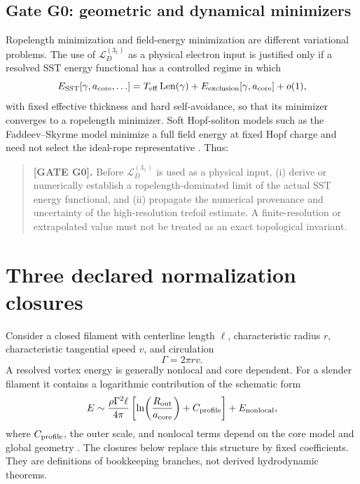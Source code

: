 \documentclass[aps,pre,preprint,notitlepage,nofootinbib,superscriptaddress]{revtex4-2}
\newcommand{\calL}{\mathcal L}
\begin{document}
\subsection{Gate G0: geometric and dynamical minimizers}
\label{subsec:G0}

Ropelength minimization and field-energy minimization are different variational problems.  The use of \(\calL_D^{(3_1)}\) as a physical electron input is justified only if a resolved SST energy functional has a controlled regime in which
\begin{equation}
  E_{\rm SST}[\gamma,a_{\rm core},\ldots]
  =
  T_{\rm eff}\operatorname{Len}(\gamma)
  +E_{\rm exclusion}[\gamma,a_{\rm core}]
  +o(1),
  \label{eq:hard-tube-limit}
\end{equation}
with fixed effective thickness and hard self-avoidance, so that its minimizer converges to a ropelength minimizer.  Soft Hopf-soliton models such as the Faddeev--Skyrme model minimize a full field energy at fixed Hopf charge and need not select the ideal-rope representative \cite{Sutcliffe2007}.  Thus:

\begin{quote}
\textbf{[GATE G0].}
Before \(\calL_D^{(3_1)}\) is used as a physical input, (i) derive or numerically establish a ropelength-dominated limit of the actual SST energy functional, and (ii) propagate the numerical provenance and uncertainty of the high-resolution trefoil estimate.  A finite-resolution or extrapolated value must not be treated as an exact topological invariant.
\end{quote}

\section{Three declared normalization closures}
\label{sec:closures}

Consider a closed filament with centerline length \(\ell\), characteristic radius \(r\), characteristic tangential speed \(v\), and circulation
\begin{equation}
  \Gamma=2\pi rv.
  \label{eq:circulation}
\end{equation}
A resolved vortex energy is generally nonlocal and core dependent.  For a slender filament it contains a logarithmic contribution of the schematic form
\begin{equation}
  E
  \sim
  \frac{\rho\Gamma^2\ell}{4\pi}
  \left[
    \ln\!\left(\frac{R_{\rm out}}{a_{\rm core}}\right)
    +C_{\rm profile}
  \right]
  +E_{\rm nonlocal},
  \label{eq:standard-line-energy}
\end{equation}
where \(C_{\rm profile}\), the outer scale, and nonlocal terms depend on the core model and global geometry \cite{Saffman1992}.  The closures below replace this structure by fixed coefficients.  They are definitions of bookkeeping branches, not derived hydrodynamic theorems.
\end{document}
